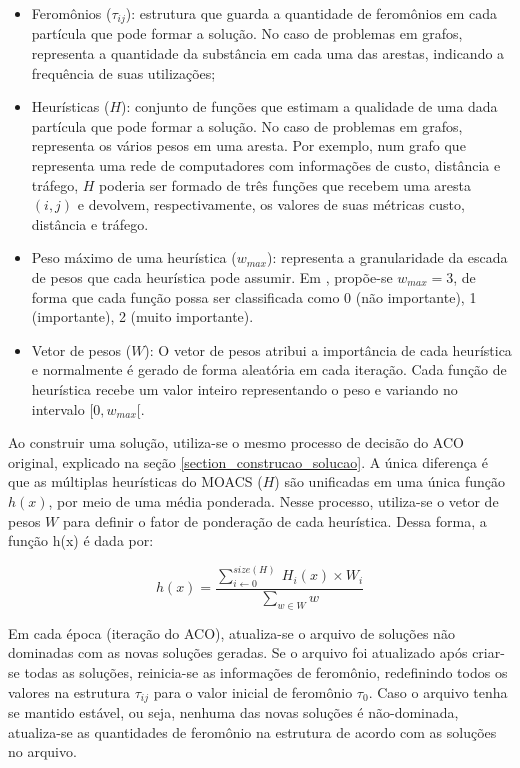\begin{itemize}  
	\item Feromônios ($\tau_{ij}$): estrutura que guarda a quantidade de feromônios em cada partícula que pode formar a solução. No caso de problemas em grafos, representa a quantidade da substância em cada uma das arestas, indicando a frequência de suas utilizações;
	\item Heurísticas ($H$): conjunto de funções que estimam a qualidade de uma dada partícula que pode formar a solução. No caso de problemas em grafos, representa os vários pesos em uma aresta. Por exemplo, num grafo que representa uma rede de computadores com informações de custo, distância e tráfego, $H$ poderia ser formado de três funções que recebem uma aresta $(i,j)$ e devolvem, respectivamente, os valores de suas métricas custo, distância e tráfego.
	\item Peso máximo de uma heurística ($w_{max}$): representa a granularidade da escada de pesos que cada heurística pode assumir. Em \cite{Riveros2016}, propõe-se $w_{max} = 3$, de forma que cada função possa ser classificada como 0 (não importante), 1 (importante), 2 (muito importante).
	\item Vetor de pesos ($W$): O vetor de pesos atribui a importância de cada heurística e normalmente é gerado de forma aleatória em cada iteração. Cada função de heurística recebe um valor inteiro representando o peso e variando no intervalo $[0, w_{max}[$.
\end{itemize}

Ao construir uma solução, utiliza-se o mesmo processo de decisão do ACO original, explicado na seção \ref{section_construcao_solucao}. A única diferença é que as múltiplas heurísticas do MOACS ($H$) são unificadas em uma única função $h(x)$, por meio de uma média ponderada. Nesse processo, utiliza-se o vetor de pesos $W$ para definir o fator de ponderação de cada heurística. Dessa forma, a função h(x) é dada por:

\begin{equation}h(x) = \frac{\sum_{i \gets 0}^{size(H)}\ H_i(x) \times W_i}{\sum_{w \in W} w}\end{equation}

Em cada época (iteração do ACO), atualiza-se o arquivo de soluções não dominadas com as novas soluções geradas. Se o arquivo foi atualizado após criar-se todas as soluções, reinicia-se as informações de feromônio, redefinindo todos os valores na estrutura $\tau_{ij}$ para o valor inicial de feromônio $\tau_0$. Caso o arquivo tenha se mantido estável, ou seja, nenhuma das novas soluções é não-dominada, atualiza-se as quantidades de feromônio na estrutura de acordo com as soluções no arquivo.

